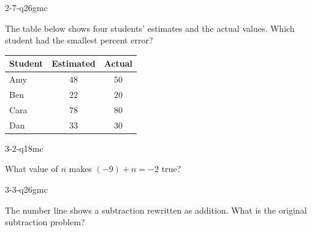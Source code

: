 \begin{practiceQuestion}{2-7-q26}{gmc}
\begin{questionText}
The table below shows four students' estimates and the actual values. Which student had the smallest percent error?

\begin{center}
\begin{tabular}{|l|c|c|}
\hline
\textbf{Student} & \textbf{Estimated} & \textbf{Actual} \\
\hline
Amy & $48$ & $50$ \\
\hline
Ben & $22$ & $20$ \\
\hline
Cara & $78$ & $80$ \\
\hline
Dan & $33$ & $30$ \\
\hline
\end{tabular}
\end{center}
\end{questionText}
\end{practiceQuestion}

\begin{practiceQuestion}{3-2-q18}{mc}
\begin{questionText}
What value of $n$ makes $(-9) + n = -2$ true?
\end{questionText}
\end{practiceQuestion}

\begin{practiceQuestion}{3-3-q26}{gmc}
\begin{questionText}
The number line shows a subtraction rewritten as addition. What is the original subtraction problem?

\begin{center}
\end{center}
\end{questionText}
\end{practiceQuestion}

